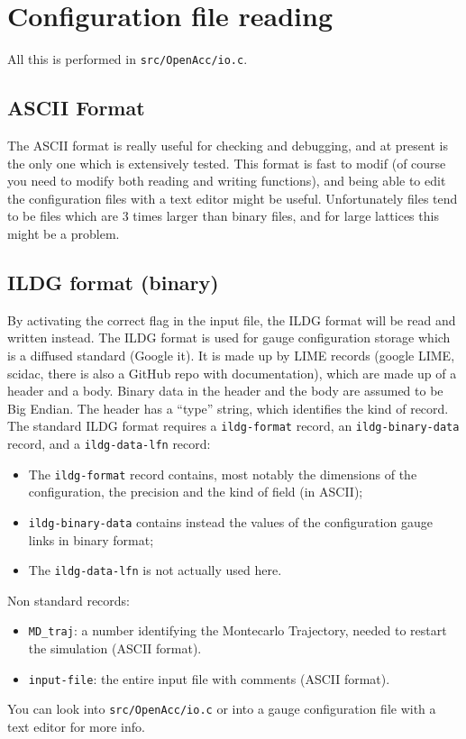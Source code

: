 \documentclass[a4paper,10pt]{book}
\begin{document}
\section{Configuration file reading}
All this is performed in \verb|src/OpenAcc/io.c|.

\subsection{ASCII Format}
The ASCII format is really useful for checking and debugging, and at present is 
the only one which is extensively tested. This format is fast to modif (of 
course you need to modify both reading and writing functions), and being able 
to edit the configuration files with a text editor might be useful.
Unfortunately files tend to be files which are 3 times larger than binary 
files, and for large lattices this might be a problem.

\subsection{ILDG format (binary)}
By activating the correct flag in the input file, the ILDG format will be read 
and written instead. The ILDG format is used for gauge configuration 
storage which is a diffused standard (Google it). It is made up by LIME records 
(google LIME, scidac, there is also a GitHub repo with documentation), which 
are made up of a header and a body. Binary data in the header and the body are 
assumed to be Big Endian. The header has a ``type'' string, which identifies the 
kind of record.
The standard ILDG format requires a \texttt{ildg-format} record, an 
\texttt{ildg-binary-data} record, and a \texttt{ildg-data-lfn} record:
\begin{itemize}
\item The \texttt{ildg-format} record contains, most notably the dimensions of 
the configuration, the precision and the kind of field (in ASCII);
\item \texttt{ildg-binary-data} contains instead the values of the 
configuration gauge links in binary format;
\item The \texttt{ildg-data-lfn} is not actually used here.
\end{itemize}
Non standard records:
\begin{itemize}
\item \verb|MD_traj|: a number identifying the Montecarlo Trajectory, needed 
to restart the simulation (ASCII format).
\item \verb|input-file|: the entire input file with comments (ASCII format).
\end{itemize}
You can look into \verb|src/OpenAcc/io.c| or into a gauge configuration 
file with a text editor for more info.
\end{document}
